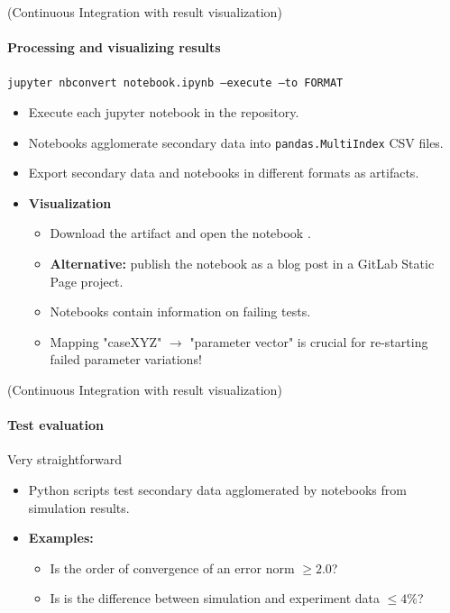 \documentclass[
	aspectratio=169,%
	color={accentcolor=2d},
	logo=true,%
	colorframetitle=true,%
	]{tudabeamer}
\begin{document}
\begin{frame}{(Continuous Integration with result visualization)} 
    \framesubtitle{Processing and visualizing results}

    \vfill

    \texttt{jupyter nbconvert notebook.ipynb --execute --to FORMAT}

    \medskip

    \begin{itemize}
        \item Execute each jupyter notebook in the repository.
        \item Notebooks agglomerate secondary data into \texttt{pandas.MultiIndex} CSV files. 
        \item Export secondary data and notebooks in different formats as artifacts.
        \item \textbf{Visualization} 
            \begin{itemize}
                \item Download the artifact and open the notebook \faGraduationCap.
                \item \textbf{Alternative:} publish the notebook as a blog post in a GitLab Static Page project. 
                \item Notebooks contain information on failing tests. 
                \item Mapping "caseXYZ" $\to$ "parameter vector" is crucial for re-starting failed parameter variations! 
            \end{itemize}
    \end{itemize}

\end{frame}


\begin{frame}{(Continuous Integration with result visualization)} 
    \framesubtitle{Test evaluation}

    \vfill

    Very straightforward 
    \begin{itemize}
        \item Python scripts test secondary data agglomerated by notebooks from simulation results.
        \item \textbf{Examples:} 
            \begin{itemize}
                \item Is the order of convergence of an error norm $\ge 2.0$?
                \item Is is the difference between simulation and experiment data $\le 4\%$? 
            \end{itemize}
    \end{itemize}

\end{frame}
\end{document}
